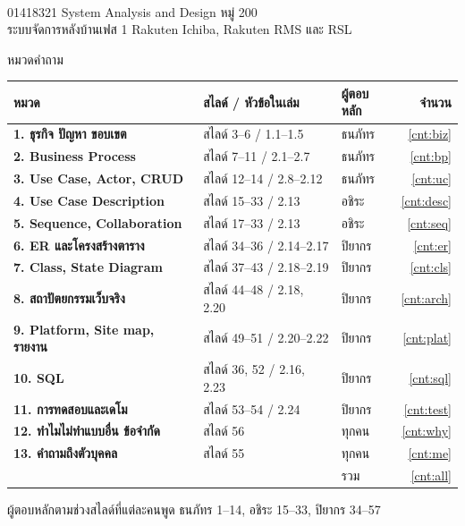 \documentclass[12pt,a4paper]{article}
\begin{document}

\begin{tcolorbox}[enhanced,colback=ink,colframe=ink,arc=4pt,left=12pt,right=12pt,top=12pt,bottom=12pt]
  \color{white}{\heavy\huge เตรียมตอบคำถาม Colorado Back-Office System}\\[4pt]
  {\large 01418321 System Analysis and Design  หมู่ 200}\\[2pt]
  {\large ระบบจัดการหลังบ้านเฟส 1  Rakuten Ichiba, Rakuten RMS และ RSL}
\end{tcolorbox}

\vspace{4pt}
{\heavy\Large หมวดคำถาม}\par
\renewcommand{\arraystretch}{1.3}
\begin{tabularx}{\linewidth}{>{\bfseries}p{5.6cm} X p{3.1cm} r}
\toprule
หมวด & สไลด์ / หัวข้อในเล่ม & ผู้ตอบหลัก & จำนวน\\
\midrule
\textcolor{sA}{1. ธุรกิจ ปัญหา ขอบเขต} & สไลด์ 3--6 / 1.1--1.5 & ธนภัทร & \ref{cnt:biz}\\
\textcolor{sA}{2. Business Process} & สไลด์ 7--11 / 2.1--2.7 & ธนภัทร & \ref{cnt:bp}\\
\textcolor{sA}{3. Use Case, Actor, CRUD} & สไลด์ 12--14 / 2.8--2.12 & ธนภัทร & \ref{cnt:uc}\\
\textcolor{sB}{4. Use Case Description} & สไลด์ 15--33 / 2.13 & อชิระ & \ref{cnt:desc}\\
\textcolor{sB}{5. Sequence, Collaboration} & สไลด์ 17--33 / 2.13 & อชิระ & \ref{cnt:seq}\\
\textcolor{sC}{6. ER และโครงสร้างตาราง} & สไลด์ 34--36 / 2.14--2.17 & ปิยากร & \ref{cnt:er}\\
\textcolor{sC}{7. Class, State Diagram} & สไลด์ 37--43 / 2.18--2.19 & ปิยากร & \ref{cnt:cls}\\
\textcolor{sC}{8. สถาปัตยกรรมเว็บจริง} & สไลด์ 44--48 / 2.18, 2.20 & ปิยากร & \ref{cnt:arch}\\
\textcolor{sC}{9. Platform, Site map, รายงาน} & สไลด์ 49--51 / 2.20--2.22 & ปิยากร & \ref{cnt:plat}\\
\textcolor{sC}{10. SQL} & สไลด์ 36, 52 / 2.16, 2.23 & ปิยากร & \ref{cnt:sql}\\
\textcolor{sC}{11. การทดสอบและเดโม} & สไลด์ 53--54 / 2.24 & ปิยากร & \ref{cnt:test}\\
\textcolor{ink}{12. ทำไมไม่ทำแบบอื่น ข้อจำกัด} & สไลด์ 56 & ทุกคน & \ref{cnt:why}\\
\textcolor{ink}{13. คำถามถึงตัวบุคคล} & สไลด์ 55 & ทุกคน & \ref{cnt:me}\\
\midrule
 & & รวม & \ref{cnt:all}\\
\bottomrule
\end{tabularx}
{\small\color{muted} ผู้ตอบหลักตามช่วงสไลด์ที่แต่ละคนพูด ธนภัทร 1--14, อชิระ 15--33, ปิยากร 34--57}
\end{document}
